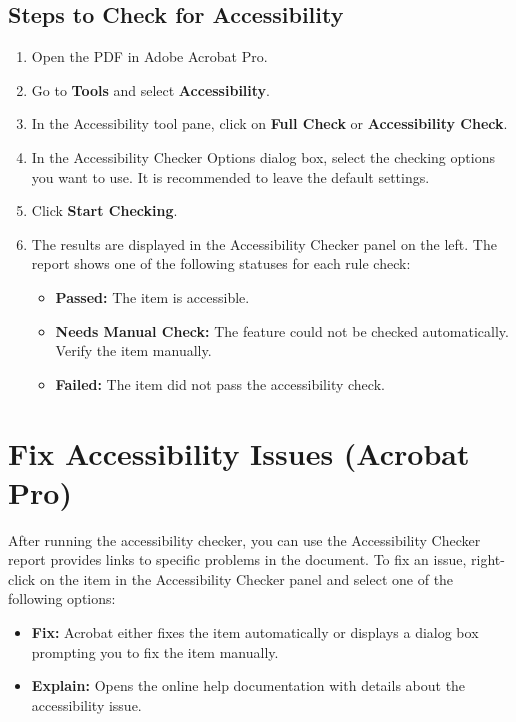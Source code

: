 \subsection{Steps to Check for Accessibility}\label{sub:steps-to-check-for-accessibility}\supercite{AdobeHelpX}

\begin{enumerate}
	\item Open the PDF in Adobe Acrobat Pro.
	\item Go to \textbf{Tools} and select \textbf{Accessibility}.
	\item In the Accessibility tool pane, click on \textbf{Full Check} or \textbf{Accessibility Check}.
	\item In the Accessibility Checker Options dialog box, select the checking options you want to use. It is recommended to leave the default settings.
	\item Click \textbf{Start Checking}.
	\item The results are displayed in the Accessibility Checker panel on the left. The report shows one of the following statuses for each rule check:
	      \begin{itemize}
		      \item \textbf{Passed:} The item is accessible.
		      \item \textbf{Needs Manual Check:} The feature could not be checked automatically. Verify the item manually.
		      \item \textbf{Failed:} The item did not pass the accessibility check.
	      \end{itemize}
\end{enumerate}

\section{Fix Accessibility Issues (Acrobat Pro)}
\label{sec:fix-accessibility-issues-acrobat-pro}

After running the accessibility checker, you can use the Accessibility Checker report provides links to specific problems in the document. To fix an issue, right-click on the item in the Accessibility Checker panel and select one of the following options:

\begin{itemize}
	\item \textbf{Fix:} Acrobat either fixes the item automatically or displays a dialog box prompting you to fix the item manually.
	\item \textbf{Explain:} Opens the online help documentation with details about the accessibility issue.
\end{itemize}

